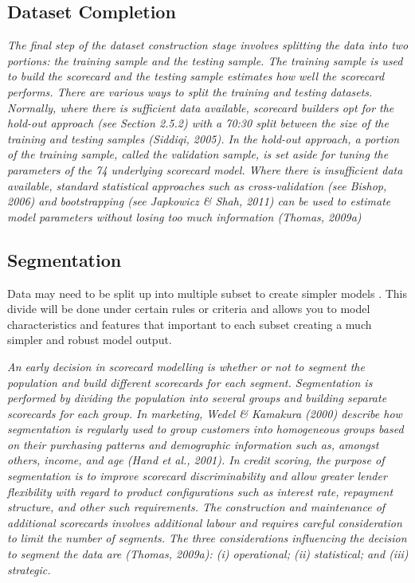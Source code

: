\subsection{Dataset Completion}
\textit{
The final step of the dataset construction stage involves splitting the data into two
portions: the training sample and the testing sample. The training sample is used
to build the scorecard and the testing sample estimates how well the scorecard performs.
There are various ways to split the training and testing datasets. Normally,
where there is sufficient data available, scorecard builders opt for the hold-out approach
(see Section 2.5.2) with a 70:30 split between the size of the training and
testing samples (Siddiqi, 2005). In the hold-out approach, a portion of the training
sample, called the validation sample, is set aside for tuning the parameters of the
74
underlying scorecard model.
Where there is insufficient data available, standard statistical approaches such as
cross-validation (see Bishop, 2006) and bootstrapping (see Japkowicz \& Shah, 2011)
can be used to estimate model parameters without losing too much information
(Thomas, 2009a) \citep{kennedy_credit_2013}
}

\subsection{Segmentation}\label{sec:segment}
Data may need to be split up into multiple subset to create simpler models \citep{myatt_making_2007}. This divide will be done under certain rules or criteria and allows you to model characteristics and features that important to each subset creating a much simpler and robust model output.


\textit{An early decision in scorecard modelling is whether or not to segment the population
and build different scorecards for each segment. Segmentation is performed
by dividing the population into several groups and building separate scorecards for
each group. In marketing, Wedel \& Kamakura (2000) describe how segmentation
is regularly used to group customers into homogeneous groups based on their purchasing
patterns and demographic information such as, amongst others, income,
and age (Hand et al., 2001). In credit scoring, the purpose of segmentation is to
improve scorecard discriminability and allow greater lender flexibility with regard
to product configurations such as interest rate, repayment structure, and other such
requirements. The construction and maintenance of additional scorecards involves
additional labour and requires careful consideration to limit the number of segments.
The three considerations influencing the decision to segment the data are (Thomas,
2009a): (i) operational; (ii) statistical; and (iii) strategic.
\citep{kennedy_credit_2013}}

